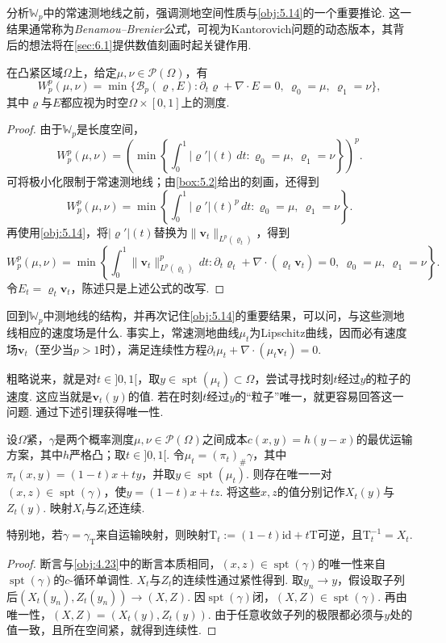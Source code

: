 \label{idx:root5-p203-bb}分析$\mathbb W_p$中的常速测地线之前，强调测地空间性质与\autoref{obj:5.14}的一个重要推论. 这一结果通常称为\emph{Benamou--Brenier公式}，可视为Kantorovich问题的动态版本，其背后的想法将在\autoref{sec:6.1}提供数值刻画时起关键作用.

\begin{theorem}\label{obj:5.28}
在凸紧区域$\Omega$上，给定$\mu,\nu\in\mathscr P(\Omega)$，有
\[
W_p^p(\mu,\nu)=\min\{\mathscr B_p(\varrho,E):\partial_t\varrho+\nabla\cdot E=0,\ \varrho_0=\mu,\ \varrho_1=\nu\},
\]
其中$\varrho$与$E$都应视为时空$\Omega\times[0,1]$上的测度.
\end{theorem}
\begin{proof}
由于$\mathbb W_p$是长度空间，
\[
W_p^p(\mu,\nu)=\left(\min\left\{\int_0^1|\varrho'|(t)\,dt:\varrho_0=\mu,\ \varrho_1=\nu\right\}\right)^p.
\]
可将极小化限制于常速测地线；由\autoref{box:5.2}给出的刻画，还得到
\[
W_p^p(\mu,\nu)=\min\left\{\int_0^1|\varrho'|(t)^p\,dt:\varrho_0=\mu,\ \varrho_1=\nu\right\}.
\]
再使用\autoref{obj:5.14}，将$|\varrho'|(t)$替换为$\|\mathbf v_t\|_{L^p(\varrho_t)}$，得到
\[
W_p^p(\mu,\nu)=\min\left\{\int_0^1\|\mathbf v_t\|_{L^p(\varrho_t)}^p\,dt:
\partial_t\varrho_t+\nabla\cdot(\varrho_t\mathbf v_t)=0,\ \varrho_0=\mu,\ \varrho_1=\nu\right\}.
\]
令$E_t=\varrho_t\mathbf v_t$，陈述只是上述公式的改写.
\end{proof}

回到$\mathbb W_p$中测地线的结构，并再次记住\autoref{obj:5.14}的重要结果，可以问，与这些测地线相应的速度场是什么. 事实上，常速测地曲线$\mu_t$为Lipschitz曲线，因而必有速度场$\mathbf v_t$（至少当$p>1$时），满足连续性方程$\partial_t\mu_t+\nabla\cdot(\mu_t\mathbf v_t)=0$.

粗略说来，就是对$t\in]0,1[$，取$y\in\operatorname{spt}(\mu_t)\subset\Omega$，尝试寻找时刻$t$经过$y$的粒子的速度. 这应当就是$\mathbf v_t(y)$的值. 若在时刻$t$经过$y$的“粒子”唯一，就更容易回答这一问题. 通过下述引理获得唯一性.

\begin{lemma}\label{obj:5.29}
设$\Omega$紧，$\gamma$是两个概率测度$\mu,\nu\in\mathscr P(\Omega)$之间成本$c(x,y)=h(y-x)$的最优运输方案，其中$h$严格凸；取$t\in]0,1[$. 令$\mu_t=(\pi_t)_\#\gamma$，其中$\pi_t(x,y)=(1-t)x+ty$，并取$y\in\operatorname{spt}(\mu_t)$. 则存在唯一一对$(x,z)\in\operatorname{spt}(\gamma)$，使$y=(1-t)x+tz$. 将这些$x,z$的值分别记作$X_t(y)$与$Z_t(y)$. 映射$X_t$与$Z_t$还连续.

特别地，若$\gamma=\gamma_{\mathrm T}$来自运输映射，则映射$\mathrm T_t:=(1-t)\mathrm{id}+t\mathrm T$可逆，且$\mathrm T_t^{-1}=X_t$.
\end{lemma}
\begin{proof}
断言与\autoref{obj:4.23}中的断言本质相同，$(x,z)\in\operatorname{spt}(\gamma)$的唯一性来自$\operatorname{spt}(\gamma)$的$c$-循环单调性. $X_t$与$Z_t$的连续性通过紧性得到. 取$y_n\to y$，假设取子列后$(X_t(y_n),Z_t(y_n))\to(X,Z)$. 因$\operatorname{spt}(\gamma)$闭，$(X,Z)\in\operatorname{spt}(\gamma)$. 再由唯一性，$(X,Z)=(X_t(y),Z_t(y))$. 由于任意收敛子列的极限都必须与$y$处的值一致，且所在空间紧，就得到连续性.
\end{proof}

